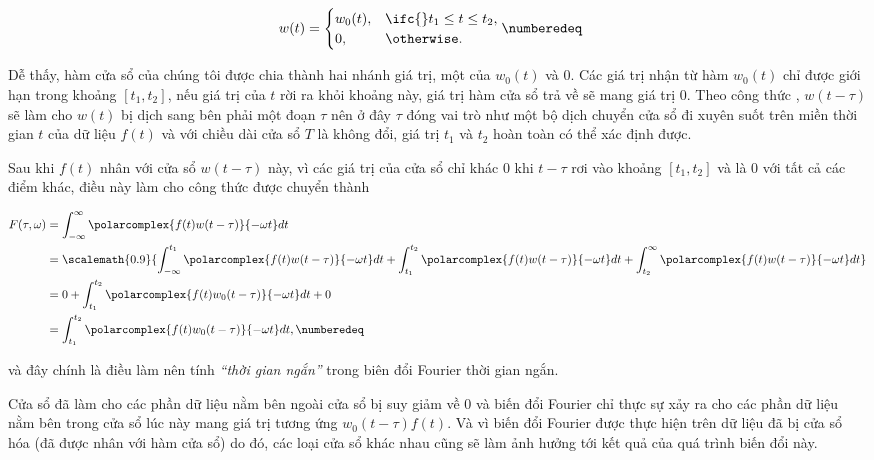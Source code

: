 			\begin{align*}
				w(t) & =
				\begin{cases}
					w_0(t),	& \ifc{} t_1 \le t \le t_2, \\
					0,		& \otherwise.
				\end{cases} \numberedeq
				\label{stft::window_formula}
			\end{align*}
		
		Dễ thấy, hàm cửa sổ của chúng tôi được chia thành hai nhánh giá trị, một của $w_0(t)$ và $0$. Các giá trị nhận từ hàm $w_0(t)$ chỉ được giới hạn trong khoảng $[t_1, t_2]$, nếu giá trị của $t$ rời ra khỏi khoảng này, giá trị hàm cửa sổ trả về sẽ mang giá trị $0$. Theo công thức , $w(t - \tau)$ sẽ làm cho $w(t)$ bị dịch sang bên phải một đoạn $\tau$ nên ở đây $\tau$ đóng vai trò như một bộ dịch chuyển cửa sổ đi xuyên suốt trên miền thời gian $t$ của dữ liệu $f(t)$ và với chiều dài cửa sổ $T$ là không đổi, giá trị $t_1$ và $t_2$ hoàn toàn có thể xác định được.
		
		Sau khi $f(t)$ nhân với cửa sổ $w(t - \tau)$ này, vì các giá trị của cửa sổ chỉ khác 0 khi $t - \tau$ rơi vào khoảng $[t_1, t_2]$ và là $0$ với tất cả các điểm khác, điều này làm cho công thức  được chuyển thành
		
			\begin{align*}
				F(\tau, \omega)	& = \int_{-\infty}^{\infty} \polarcomplex{f(t) w(t - \tau)}{-\omega t}dt \\
								& = \scalemath{0.9}{\int_{-\infty}^{t_1} \polarcomplex{f(t) w(t - \tau)}{-\omega t}dt
								+ \int_{t_1}^{t_2} \polarcomplex{f(t) w(t - \tau)}{-\omega t}dt + \int_{t_2}^{\infty} \polarcomplex{f(t) w(t - \tau)}{-\omega t}dt} \\
								& = 0
								+ \int_{t_1}^{t_2} \polarcomplex{f(t) w_0(t - \tau)}{-\omega t}dt
								+ 0 \\
								& = \int_{t_1}^{t_2} \polarcomplex{f(t) w_0(t - \tau)}{-\omega t}dt, \numberedeq
			\end{align*}
		
		\noindent và đây chính là điều làm nên tính \textit{``thời gian ngắn''} trong biên đổi Fourier thời gian ngắn. 
		
		Cửa sổ đã làm cho các phần dữ liệu nằm bên ngoài cửa sổ bị suy giảm về $0$ và biến đổi Fourier chỉ thực sự xảy ra cho các phần dữ liệu nằm bên trong cửa sổ lúc này mang giá trị tương ứng $w_0(t - \tau) f(t)$. Và vì biến đổi Fourier được thực hiện trên dữ liệu đã bị cửa sổ hóa (đã được nhân với hàm cửa sổ) do đó, các loại cửa sổ khác nhau cũng sẽ làm ảnh hưởng tới kết quả của quá trình biến đổi này.
		
